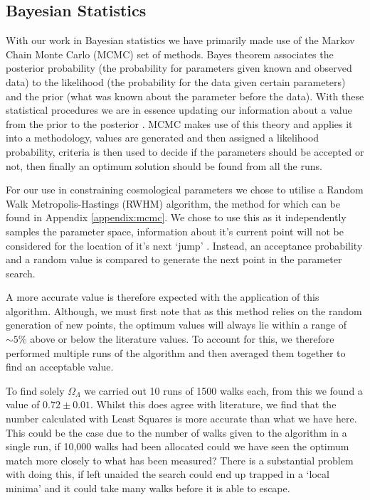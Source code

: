 \documentclass[twocolumn]{revtex4}
\begin{document}
{\vspace{-3ex}
\subsection{Bayesian Statistics} 
\vspace{-2ex}
With our work in Bayesian statistics we have primarily made use of the Markov Chain Monte Carlo (MCMC) set of methods. Bayes theorem associates the posterior probability (the probability for parameters given known and observed data) to the likelihood (the probability for the data given certain parameters) and the prior (what was known about the parameter before the data). With these statistical procedures we are in essence updating our information about a value from the prior to the posterior \cite{mcmc_bs}. MCMC makes use of this theory and applies it into a methodology, values are generated and then assigned a likelihood probability, criteria is then used to decide if the parameters should be accepted or not, then finally an optimum solution should be found from all the runs.

For our use in constraining cosmological parameters we chose to utilise a Random Walk Metropolis-Hastings (RWHM) algorithm, the method for which can be found in Appendix \ref{appendix:mcmc}. We chose to use this as it independently samples the parameter space, information about it's current point will not be considered for the location of it's next `jump' \cite{mcmc_bs}. Instead, an acceptance probability and a random value is compared to generate the next point in the parameter search.

A more accurate value is therefore expected with the application of this algorithm. Although, we must first note that as this method relies on the random generation of new points, the optimum values will always lie within a range of $\sim 5\%$ above or below the literature values. To account for this, we therefore performed multiple runs of the algorithm and then averaged them together to find an acceptable value. 

To find solely $\Omega_\Lambda$ we carried out 10 runs of 1500 walks each, from this we found a value of $0.72\pm0.01$. Whilst this does agree with literature, we find that the number calculated with Least Squares is more accurate than what we have here. This could be the case due to the number of walks given to the algorithm in a single run, if 10,000 walks had been allocated could we have seen the optimum match more closely to what has been measured? There is a substantial problem with doing this, if left unaided the search could end up trapped in a `local minima' and it could take many walks before it is able to escape. 

}
\end{document}
